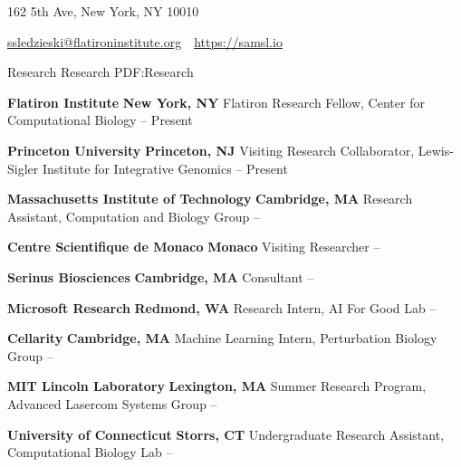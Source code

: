 \documentclass[letterpaper,MMMyyyy,nonstopmode]{simpleresumecv}
\newcommand{\CVAuthor}{Samuel Sledzieski}
\newcommand{\CVWebpage}{https://samsl.io}
\begin{document}
\Title{\CVAuthor}

\begin{SubTitle}
162 5th Ave, New York, NY 10010
\par
\href{mailto:ssledzieski@flatironinstitute.org}
{ssledzieski@flatironinstitute.org}
\,\SubBulletSymbol\,
\href{\CVWebpage}
{\url{\CVWebpage}}
\end{SubTitle}

\begin{Body}

\Section
{Research}
{Research}
{PDF:Research}

\Entry
{\textbf{Flatiron Institute}}
\hfill \textbf{New York, NY}
\Gap
\Item Flatiron Research Fellow, Center for Computational Biology
\hfill
{} -- Present
\BigGap

\Entry
{\textbf{Princeton University}}
\hfill \textbf{Princeton, NJ}
\Gap
\Item Visiting Research Collaborator, Lewis-Sigler Institute for Integrative Genomics
\hfill
{} -- Present
\BigGap

\Entry
{\textbf{Massachusetts Institute of Technology}}
\hfill \textbf{Cambridge, MA}
\Gap
\Item Research Assistant, Computation and Biology Group
\hfill
{} -- 
\BigGap

\Entry
{\textbf{Centre Scientifique de Monaco}}
\hfill \textbf{Monaco}
\Gap
\Item Visiting Researcher
\hfill
{} -- 
\BigGap

\Entry
{\textbf{Serinus Biosciences}}
\hfill \textbf{Cambridge, MA}
\Gap
\Item Consultant
\hfill
{} -- 
\BigGap

\Entry
{\textbf{Microsoft Research}}
\hfill \textbf{Redmond, WA}
\Gap
\Item Research Intern, AI For Good Lab
\hfill
{} -- 
\BigGap

\Entry
{\textbf{Cellarity}}
\hfill \textbf{Cambridge, MA}
\Gap
\Item Machine Learning Intern, Perturbation Biology Group
\hfill
{} -- 
\BigGap

\Entry
{\textbf{MIT Lincoln Laboratory}}
\hfill \textbf{Lexington, MA}
\Gap
\Item Summer Research Program, Advanced Lasercom Systems Group
\hfill
{} --
\BigGap

\Entry
{\textbf{University of Connecticut}}
\hfill \textbf{Storrs, CT}
\Gap
\Item Undergraduate Research Assistant, Computational Biology Lab
\hfill
{} --


\end{Body}
\end{document}
